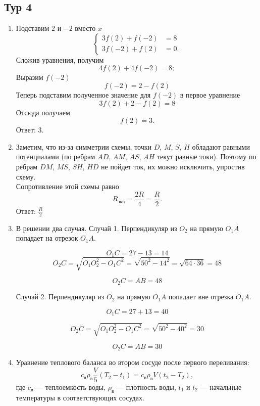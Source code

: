 \documentclass[12pt]{article} %
\begin{document}
\subsection*{Тур 4}

\begin{enumerate}
    \item 
        Подставим $2$ и $-2$ вместо $x$
        \[
            \left\{
            \begin{aligned}
            3f(2) + f(-2) &= 8\\
            3f(-2) + f(2) &= 0.
            \end{aligned}
            \right.
        \]
        Сложив уравнения, получим
        \[
            4f(2)+4f(-2) = 8;
        \]
        Выразим $f(-2)$
        \[
            f(-2) = 2 - f(2)
        \]
        Теперь подставим полученное значение для $f(-2)$ в первое уравнение
        \[
            3f(2) + 2 - f(2) = 8
        \]
        Отсюда получаем
        \[
            f(2)=3.
        \]
        Ответ: $3$.
    \item 
        Заметим, что из-за симметрии схемы, точки $D$, $M$, $S$, $H$ 
        обладают равными потенциалами (по ребрам $AD$, $AM$, $AS$, $AH$ текут равные токи). Поэтому по ребрам $DM$, $MS$, $SH$, $HD$ не пойдет ток, их можно исключить, упростив схему.\\
        Сопротивление этой схемы равно
        \[
            R_{\text{экв}}=\frac{2R}{4}=\frac{R}{2}.
        \]
        Ответ: $\frac{R}{2}$ %
    \item В решении два случая. 
    Случай 1. Перпендикуляр из $O_2$ на прямую $O_1 A$ попадает на отрезок $O_1 A$.

    \[
    O_1 C = 27 - 13 = 14    
    \]
    \[
    O_2 C = \sqrt{O_1 O_2^2 - O_1 C^2} = \sqrt{50^2 - 14^2}=\sqrt{64\cdot 36} = 48 
    \]

    \[
    O_2 C = AB = 48    
    \]


    Случай 2. Перпендикуляр из $O_2$ на прямую $O_1 A$ попадает вне отрезка $O_1 A$.

    \[
    O_1 C = 27 + 13 = 40
    \]

    \[
        O_2 C = \sqrt{O_1 O_2^2 - O_1 C^2} = \sqrt{50^2 - 40^2}=30 
    \]


    \[
    O_2 C = AB = 30    
    \]



    \item 
        Уравнение теплового баланса во втором сосуде после первого переливания:
        \[
            c_{\text{в}}\rho_{\text{в}}\frac{V}{5}(T_2-t_1) = c_{\text{в}}\rho_{\text{в}}V(t_2 - T_2),
        \]
        где $c_{\text{в}}$ — теплоемкость воды, $\rho_{\text{в}}$ — плотность воды, $t_1$ и $t_2$ — начальные температуры в соответствующих сосудах.
        

\end{enumerate}
\end{document}
